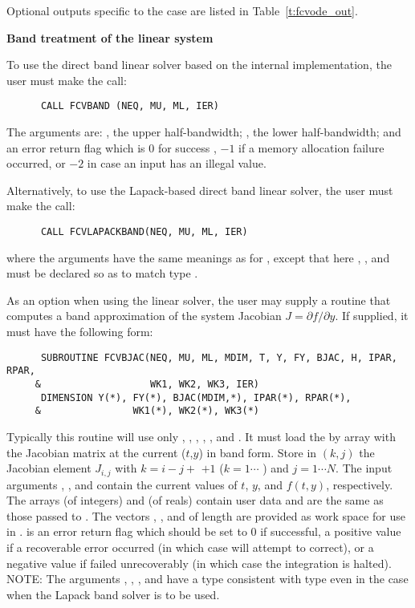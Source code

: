 \begin{Steps}
  Optional outputs specific to the {\dense} case are listed in
  Table~\ref{t:fcvode_out}.


  {\s} {\bf Band treatment of the linear system}
  
  To use the direct band linear solver based on the internal {\cvode}
  implementation, the user must make the call:
\begin{verbatim}
      CALL FCVBAND (NEQ, MU, ML, IER)
\end{verbatim}
  The arguments are: , the upper half-bandwidth; , 
  the lower half-bandwidth; and  an error return flag which is 
  $0$ for success , $-1$ if a memory allocation failure occurred, or $-2$ 
  in case an input has an illegal value.     
  
  Alternatively, to use the Lapack-based direct band linear solver, 
  the user must make the call:
\begin{verbatim}
      CALL FCVLAPACKBAND(NEQ, MU, ML, IER)
\end{verbatim}
  where the arguments have the same meanings as for , except
  that here , , and  must be declared so as to match
  {\C} type .

  As an option when using the {\band} linear solver, the user may supply a
  routine that computes a band approximation of the system Jacobian 
  $J = \partial f / \partial y$. If supplied, it must have the following form:
\begin{verbatim}
      SUBROUTINE FCVBJAC(NEQ, MU, ML, MDIM, T, Y, FY, BJAC, H, IPAR, RPAR,
     &                   WK1, WK2, WK3, IER)
      DIMENSION Y(*), FY(*), BJAC(MDIM,*), IPAR(*), RPAR(*),
     &                WK1(*), WK2(*), WK3(*)
\end{verbatim}
  Typically this routine will use only , , , , 
  , and .
  It must load the  by  array  with the Jacobian matrix
  at the current ($t$,$y$) in band form.  Store in $(k,j)$ the Jacobian
  element $J_{i,j}$ with $k = i - j + $  $ + 1$ ($k = 1 \cdots $
  ) and $j = 1 \cdots N$.
  The input arguments , , and  contain the current
  values of $t$, $y$, and $f(t,y)$, respectively.
  The arrays  (of integers) and  (of reals) contain user data
  and are the same as those passed to .
  The vectors , ,
  and  of length  are provided as work space for use in
  .
   is an error return flag which should be set to $0$ if successful, 
  a positive value if a recoverable error occurred (in which case {\cvode} will 
  attempt to correct), or a negative value if  failed unrecoverably 
  (in which case the integration is halted).
  NOTE: The arguments , , , and  have a type
  consistent with {\C} type  even in the case when the Lapack band
  solver is to be used.


\end{Steps}
